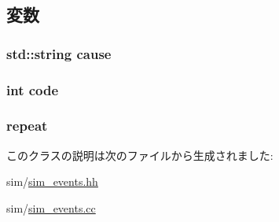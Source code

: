 \subsection{変数}
\hypertarget{classLocalSimLoopExitEvent_ae4eec0077e30624726ddd2a0947962e5}{
\subsubsection[{cause}]{\setlength{\rightskip}{0pt plus 5cm}std::string {\bf cause}}}
\label{classLocalSimLoopExitEvent_ae4eec0077e30624726ddd2a0947962e5}
\hypertarget{classLocalSimLoopExitEvent_a45a5b7c00a796a23f01673cef1dbe0a9}{
\subsubsection[{code}]{\setlength{\rightskip}{0pt plus 5cm}int {\bf code}}}
\label{classLocalSimLoopExitEvent_a45a5b7c00a796a23f01673cef1dbe0a9}
\hypertarget{classLocalSimLoopExitEvent_a186e97c430ff343e8ab14129eaa8375d}{
\subsubsection[{repeat}]{ {\bf repeat}}}
\label{classLocalSimLoopExitEvent_a186e97c430ff343e8ab14129eaa8375d}


このクラスの説明は次のファイルから生成されました:\begin{DoxyCompactItemize}
\item 
sim/\hyperlink{sim__events_8hh}{sim\_\-events.hh}\item 
sim/\hyperlink{sim__events_8cc}{sim\_\-events.cc}\end{DoxyCompactItemize}
